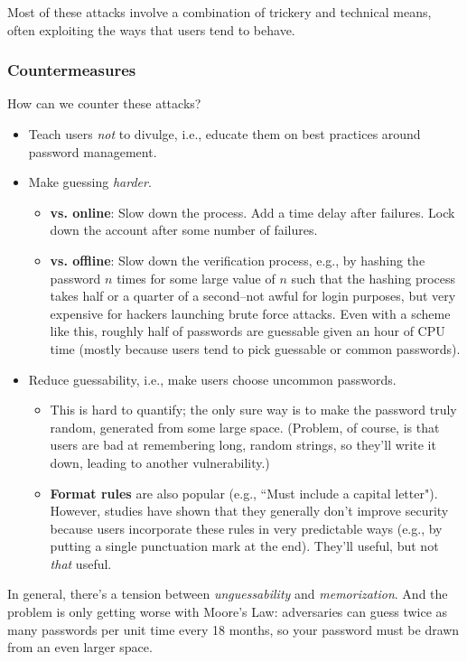 \documentclass[12pt]{article}
\begin{document}
Most of these attacks involve a combination of trickery and technical means, often exploiting the ways that users tend to behave.

\subsubsection*{Countermeasures}

How can we counter these attacks?

\begin{itemize}
\item Teach users \textit{not} to divulge, i.e., educate them on best practices around password management.
\item Make guessing \textit{harder}.
\begin{itemize}
\item \textbf{vs. online}: Slow down the process. Add a time delay after failures. Lock down the account after some number of failures.
\item \textbf{vs. offline}: Slow down the verification process, e.g., by hashing the password $n$ times for some large value of $n$ such that the hashing process takes half or a quarter of a second--not awful for login purposes, but very expensive for hackers launching brute force attacks. Even with a scheme like this, roughly half of passwords are guessable given an hour of CPU time (mostly because users tend to pick guessable or common passwords).
\end{itemize}
\item Reduce guessability, i.e., make users choose uncommon passwords.
\begin{itemize}
\item This is hard to quantify; the only sure way is to make the password truly random, generated from some large space. (Problem, of course, is that users are bad at remembering long, random strings, so they'll write it down, leading to another vulnerability.)
\item \textbf{Format rules} are also popular (e.g., ``Must include a capital letter"). However, studies have shown that they generally don't improve security because users incorporate these rules in very predictable ways (e.g., by putting a single punctuation mark at the end). They'll useful, but not \textit{that} useful.
\end{itemize}
\end{itemize}

In general, there's a tension between \textit{unguessability} and \textit{memorization}. And the problem is only getting worse with Moore's Law: adversaries can guess twice as many passwords per unit time every 18 months, so your password must be drawn from an even larger space.
\end{document}
